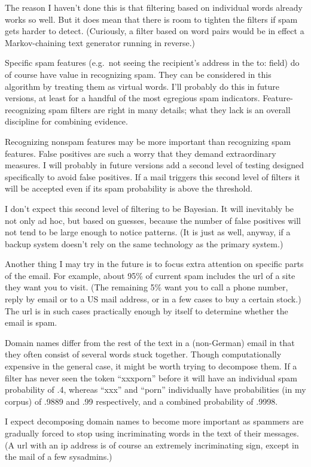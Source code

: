 The reason I haven't done this is that filtering based on individual
words already works so well. But it does mean that there is room to
tighten the filters if spam gets harder to detect. (Curiously, a filter
based on word pairs would be in effect a Markov-chaining text generator
running in reverse.)

Specific spam features (e.g.~not seeing the recipient's address in the
to: field) do of course have value in recognizing spam. They can be
considered in this algorithm by treating them as virtual words. I'll
probably do this in future versions, at least for a handful of the most
egregious spam indicators. Feature-recognizing spam filters are right in
many details; what they lack is an overall discipline for combining
evidence.

Recognizing nonspam features may be more important than recognizing spam
features. False positives are such a worry that they demand
extraordinary measures. I will probably in future versions add a second
level of testing designed specifically to avoid false positives. If a
mail triggers this second level of filters it will be accepted even if
its spam probability is above the threshold.

I don't expect this second level of filtering to be Bayesian. It will
inevitably be not only ad hoc, but based on guesses, because the number
of false positives will not tend to be large enough to notice patterns.
(It is just as well, anyway, if a backup system doesn't rely on the same
technology as the primary system.)

Another thing I may try in the future is to focus extra attention on
specific parts of the email. For example, about 95\% of current spam
includes the url of a site they want you to visit. (The remaining 5\%
want you to call a phone number, reply by email or to a US mail address,
or in a few cases to buy a certain stock.) The url is in such cases
practically enough by itself to determine whether the email is spam.

Domain names differ from the rest of the text in a (non-German) email in
that they often consist of several words stuck together. Though
computationally expensive in the general case, it might be worth trying
to decompose them. If a filter has never seen the token ``xxxporn''
before it will have an individual spam probability of .4, whereas
``xxx'' and ``porn'' individually have probabilities (in my corpus) of
.9889 and .99 respectively, and a combined probability of .9998.

I expect decomposing domain names to become more important as spammers
are gradually forced to stop using incriminating words in the text of
their messages. (A url with an ip address is of course an extremely
incriminating sign, except in the mail of a few sysadmins.)

